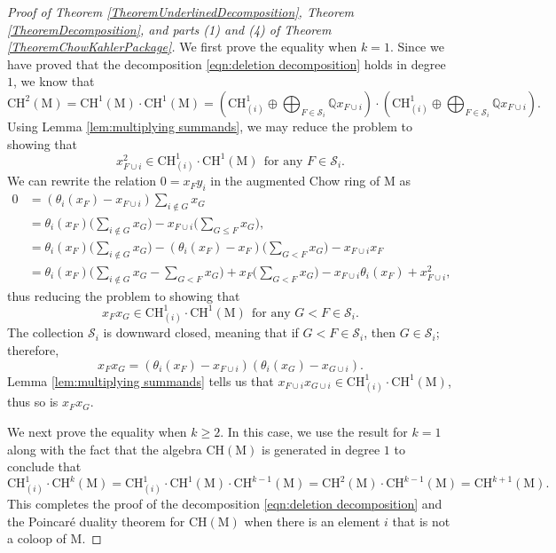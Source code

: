 \documentclass[11pt,reqno]{amsart}
\theoremstyle{definition}
\theoremstyle{remark}
\renewcommand{\(}{\left(}
\renewcommand{\)}{\right)}
\newcommand{\<}{\left<}
\renewcommand{\>}{\right>}
\begin{document}
\begin{proof}[Proof of Theorem \ref{TheoremUnderlinedDecomposition}, Theorem \ref{TheoremDecomposition}, and 
parts (1) and (4) of Theorem \ref{TheoremChowKahlerPackage}]
We first prove the equality when $k=1$. 
Since we have proved that the decomposition \eqref{eqn:deletion decomposition} holds in degree $1$, we know that
\[
\mathrm{CH}^2(\mathrm{M}) = \mathrm{CH}^1(\mathrm{M})\cdot \mathrm{CH}^1(\mathrm{M})
= \left(\mathrm{CH}^1_{(i)} \oplus\bigoplus_{F \in \mathscr{S}_i} \mathbb{Q} x_{F\cup i}\right)
\cdot \left(\mathrm{CH}^1_{(i)} \oplus\bigoplus_{F \in \mathscr{S}_i} \mathbb{Q} x_{F\cup i}\right).
\]
Using Lemma \ref{lem:multiplying summands}, we may reduce the problem to showing that 
\[
x_{F\cup i}^2\in \mathrm{CH}^1_{(i)}\cdot \mathrm{CH}^1(\mathrm{M}) \ \ \text{for any $F\in \mathscr{S}_i$.}
\]
We can rewrite the relation $0 = x_{F}y_i$ in the augmented Chow ring of $\mathrm{M}$ as
\begin{align*}
0 & = (\theta_i(x_{F}) - x_{F\cup i})\sum_{i \notin G} x_G\\
& = \theta_i(x_{F})\Big(\sum_{i \notin G} x_G\Big) - x_{F\cup i}\Big(\sum_{G\leq F} x_G\Big),\\
& = \theta_i(x_{F})\Big(\sum_{i \notin G} x_G\Big) - (\theta_i(x_{F})-x_{F})\Big(\sum_{G< F} x_G\Big)-x_{F\cup i} x_{F}\\
& = \theta_i(x_{F})\Big(\sum_{i \notin G} x_G- \sum_{G< F} x_G\Big)+ x_{F}\Big(\sum_{G<F} x_G\Big)-x_{F\cup i}\theta_i(x_{F})+x_{F\cup i}^2, 
\end{align*}
thus reducing the problem to showing that 
\[
x_F x_G\in \mathrm{CH}^1_{(i)}\cdot \mathrm{CH}^1(\mathrm{M}) \ \ \text{for any $G < F\in \mathscr{S}_i$.}
\]
The collection $\mathscr{S}_i$ is downward closed, meaning that if $G<F\in \mathscr{S}_i$, then $G\in \mathscr{S}_i$;
therefore, 
\[
x_F x_G = (\theta_i(x_F) - x_{F\cup i})(\theta_i(x_G) - x_{G\cup i}).
\]
Lemma \ref{lem:multiplying summands} tells us that  $x_{F\cup i}x_{G\cup i}\in \mathrm{CH}^1_{(i)}\cdot \mathrm{CH}^1(\mathrm{M})$,
thus so is $x_Fx_G$.

We next prove the equality when  $k\geq 2$.
In this case, we use the result for $k=1$ along with the fact that the algebra $\mathrm{CH}(\mathrm{M})$ is generated in degree $1$ to conclude that
\[
\mathrm{CH}^1_{(i)}\cdot \mathrm{CH}^{k}(\mathrm{M})=\mathrm{CH}^1_{(i)} \cdot \mathrm{CH}^{1}(\mathrm{M}) \cdot \mathrm{CH}^{k-1}(\mathrm{M})=\mathrm{CH}^{2}(\mathrm{M}) \cdot \mathrm{CH}^{k-1}(\mathrm{M})=\mathrm{CH}^{k+1}(\mathrm{M}).
\]
This completes the proof of 
the decomposition \eqref{eqn:deletion decomposition} and the Poincar\'e duality theorem for $\mathrm{CH}(\mathrm{M})$ when there is an element $i$ that is not a coloop of $\mathrm{M}$.


\end{proof}
\end{document}
